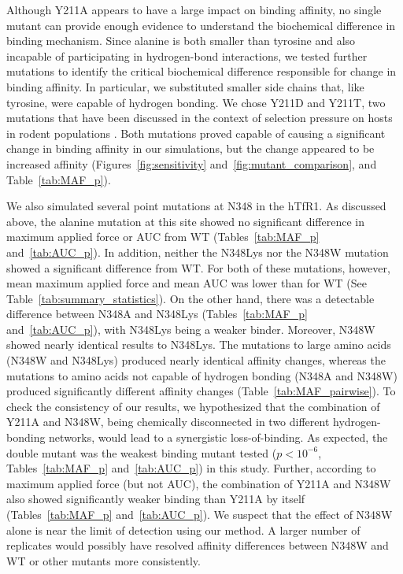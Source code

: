 \documentclass[12pt]{article}
\begin{document}
Although Y211A appears to have a large impact on binding affinity, no single mutant can provide enough evidence to understand the biochemical difference in binding mechanism. Since alanine is both smaller than tyrosine and also incapable of participating in hydrogen-bond interactions, we tested further mutations to identify the critical biochemical difference responsible for change in binding affinity. In particular, we substituted smaller side chains that, like tyrosine, were capable of hydrogen bonding. We chose Y211D and Y211T, two mutations that have been discussed in the context of selection pressure on hosts in rodent populations \citep{Rad2008,Rad20111,Rad20112}. Both mutations proved capable of causing a significant change in binding affinity in our simulations, but the change appeared to be increased affinity (Figures~\ref{fig:sensitivity} and~\ref{fig:mutant_comparison}, and Table~\ref{tab:MAF_p}).

We also simulated several point mutations at N348 in the hTfR1. As discussed above, the alanine mutation at this site showed no significant difference in maximum applied force or AUC from WT (Tables~\ref{tab:MAF_p} and~\ref{tab:AUC_p}). In addition, neither the N348Lys nor the N348W mutation showed a significant difference from WT. For both of these mutations, however, mean maximum applied force and mean AUC was lower than for WT (See Table~\ref{tab:summary_statistics}).  On the other hand, there was a detectable difference between N348A and N348Lys (Tables~\ref{tab:MAF_p} and~\ref{tab:AUC_p}), with N348Lys being a weaker binder. Moreover, N348W showed nearly identical results to N348Lys. The mutations to large amino acids (N348W and N348Lys) produced nearly identical affinity changes, whereas the mutations to amino acids not capable of hydrogen bonding (N348A and N348W) produced significantly different affinity changes (Table~\ref{tab:MAF_pairwise}). To check the consistency of our results, we hypothesized that the combination of Y211A and N348W, being chemically disconnected in two different hydrogen-bonding networks, would lead to a synergistic loss-of-binding. As expected, the double mutant was the weakest binding mutant tested ($ p < 10^{-6} $, Tables~\ref{tab:MAF_p} and~\ref{tab:AUC_p}) in this study. Further, according to maximum applied force (but not AUC), the combination of Y211A and N348W also showed significantly weaker binding than Y211A by itself (Tables~\ref{tab:MAF_p} and~\ref{tab:AUC_p}). We suspect that the effect of N348W alone is near the limit of detection using our method. A larger number of replicates would possibly have resolved affinity differences between N348W and WT or other mutants more consistently.
\end{document}
